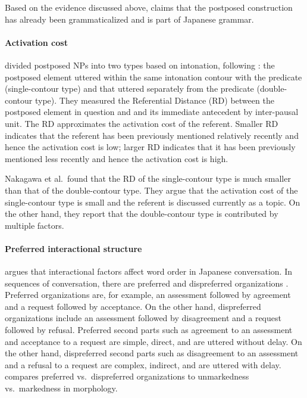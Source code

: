 Based on the evidence discussed above,
 claims that the postposed construction has already been grammaticalized and is part of Japanese grammar.


\paragraph{Activation cost}

 divided postposed NPs into two types
based on intonation,
following :
the postposed element uttered within the same intonation contour with the predicate (single-contour type) and
that uttered separately from the predicate (double-contour type).
They measured the Referential Distance (RD) between the postposed element in question and and its immediate antecedent by inter-pausal unit.
The RD approximates the activation cost of the referent.
Smaller RD indicates that the referent has been previously mentioned relatively recently and hence the activation cost is low;
larger RD indicates that it has been previously mentioned less recently
and hence the activation cost is high.

Nakagawa et al.~found that
the RD of the single-contour type is much smaller than that of the double-contour type.
They argue that the activation cost of the single-contour type is small
and the referent is discussed currently as a topic.
On the other hand, they report that the double-contour type is contributed by multiple factors.


\paragraph{Preferred interactional structure}

 argues that
interactional factors affect word order in Japanese conversation.
In sequences of conversation,
there are preferred and dispreferred organizations \cite{schegloffetal77,heritage84,pomerantz84}.
Preferred organizations are, for example,
an assessment followed by agreement and a request followed by acceptance.
On the other hand,
dispreferred organizations include
an assessment followed by disagreement and a request followed by refusal.
Preferred second parts such as agreement to an assessment and acceptance to a request are simple, direct, and are uttered without delay.
On the other hand,
dispreferred second parts such as disagreement to an assessment and a refusal to a request are complex, indirect, and are uttered with delay.
 compares preferred vs.~dispreferred organizations to unmarkedness vs.~markedness in morphology.

